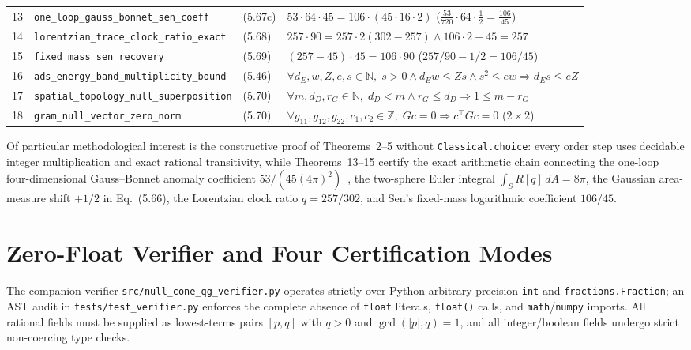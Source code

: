 \documentclass[10pt,twocolumn]{article}
\begin{document}
\begin{table}[tb]
\begin{tabular}{@{}rllp{7.4cm}@{}}
13 & \texttt{one\_loop\_gauss\_bonnet\_sen\_coeff} & (5.67c) & $53\cdot 64\cdot 45 = 106\cdot(45\cdot 16\cdot 2)$ ($\frac{53}{720}\cdot 64\cdot\frac{1}{2}=\frac{106}{45}$) \\
14 & \texttt{lorentzian\_trace\_clock\_ratio\_exact} & (5.68) & $257\cdot 90 = 257\cdot 2(302-257) \wedge 106\cdot 2 + 45 = 257$ \\
15 & \texttt{fixed\_mass\_sen\_recovery} & (5.69) & $(257 - 45)\cdot 45 = 106\cdot 90$ ($257/90 - 1/2 = 106/45$) \\
16 & \texttt{ads\_energy\_band\_multiplicity\_bound} & (5.46) & $\forall d_E,w,Z,e,s\in\mathbb{N},\; s>0 \wedge d_E w \le Z s \wedge s^2 \le e w \Rightarrow d_E s \le e Z$ \\
17 & \texttt{spatial\_topology\_null\_superposition} & (5.70) & $\forall m,d_D,r_G\in\mathbb{N},\; d_D < m \wedge r_G \le d_D \Rightarrow 1 \le m - r_G$ \\
18 & \texttt{gram\_null\_vector\_zero\_norm} & (5.70) & $\forall g_{11},g_{12},g_{22},c_1,c_2\in\mathbb{Z},\; Gc=0 \Rightarrow c^\top G c = 0$ ($2\times 2$) \\
\bottomrule
\end{tabular}
\end{table}

Of particular methodological interest is the constructive proof of Theorems~2--5 without \texttt{Classical.choice}: every order step uses decidable integer multiplication and exact rational transitivity, while Theorems~13--15 certify the exact arithmetic chain connecting the one-loop four-dimensional Gauss--Bonnet anomaly coefficient $53/(45(4\pi)^2)$~\cite{Sen2013}, the two-sphere Euler integral $\int_S R[q]\,dA = 8\pi$, the Gaussian area-measure shift $+1/2$ in Eq.~(5.66), the Lorentzian clock ratio $q = 257/302$, and Sen's fixed-mass logarithmic coefficient $106/45$.

\section{Zero-Float Verifier and Four Certification Modes}
The companion verifier \texttt{src/null\_cone\_qg\_verifier.py} operates strictly over Python arbitrary-precision \texttt{int} and \texttt{fractions.Fraction}; an AST audit in \texttt{tests/test\_verifier.py} enforces the complete absence of \texttt{float} literals, \texttt{float()} calls, and \texttt{math}/\texttt{numpy} imports. All rational fields must be supplied as lowest-terms pairs $[p, q]$ with $q > 0$ and $\gcd(|p|, q) = 1$, and all integer/boolean fields undergo strict non-coercing type checks.
\end{document}
